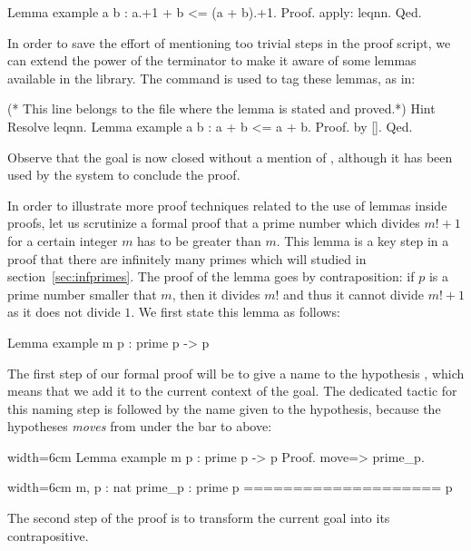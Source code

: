 \begin{coq}{}{}
Lemma example a b : a.+1 + b <= (a + b).+1.
Proof. apply: leqnn. Qed.
\end{coq}
In order to save the effort of mentioning too trivial
steps in the proof script, we can extend the power of the 
terminator to make it aware of some lemmas available in
the library. The  command is used to tag these lemmas,
as in:

\begin{coq}{}{}
(* This line belongs to the file where the lemma is stated and proved.*)
Hint Resolve leqnn.
Lemma example a b : a + b <= a + b.
Proof.  by [].  Qed.
\end{coq}
Observe that the goal is now closed without a mention of ,
although it has been used by the system to conclude the proof.

In order to illustrate more proof techniques related to the use of
lemmas inside proofs, let us scrutinize a formal proof that a prime
number which divides $m! + 1$ for a certain integer $m$ has to be
greater than $m$. This lemma is a key step in a proof that there are
infinitely many primes which will studied in
section~\ref{sec:infprimes}. The proof of the lemma goes by
contraposition: if $p$ is a prime number smaller that $m$, then it
divides $m!$ and thus it cannot divide $m! + 1$ as it does not divide
$1$. We first state this lemma as follows:

\begin{coq}{}{}
Lemma example m p : prime p -> p %
\end{coq}
The first step of our formal proof will be to give a name to the
hypothesis , which means that we add it to the
current context of the goal. The dedicated tactic for this naming step is
 followed by the name given to the hypothesis, because the
hypotheses \emph{moves} from under the bar to above:

\begin{coq}{}{width=6cm}
Lemma example m p : prime p ->
  p %
Proof.
move=> prime_p.
\end{coq}
\begin{coqout}{}{width=6cm}
m, p : nat
prime_p : prime p
====================
p %
\end{coqout}
The second step of the proof is to transform the current goal into its
contrapositive.

